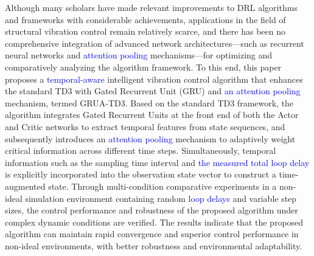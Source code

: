 \documentclass[review]{elsarticle}
\begin{document}
Although many scholars have made relevant improvements to DRL algorithms and frameworks with considerable achievements, applications in the field of structural vibration control remain relatively scarce, and there has been no comprehensive integration of advanced network architectures—such as recurrent neural networks and \textcolor{blue}{attention pooling} mechanisms—for optimizing and comparatively analyzing the algorithm framework.
To this end, this paper proposes a \textcolor{blue}{temporal-aware} intelligent vibration control algorithm that enhances the standard TD3 with Gated Recurrent Unit (GRU) and \textcolor{blue}{an attention pooling} mechanism, termed GRUA-TD3.
Based on the standard TD3 framework, the algorithm integrates Gated Recurrent Units at the front end of both the Actor and Critic networks to extract temporal features from state sequences, and subsequently introduces an \textcolor{blue}{attention pooling} mechanism to adaptively weight critical information across different time steps.
Simultaneously, temporal information such as the sampling time interval and \textcolor{blue}{the measured total loop delay} is explicitly incorporated into the observation state vector to construct a time-augmented state.
Through multi-condition comparative experiments in a non-ideal simulation environment containing random \textcolor{blue}{loop delays} and variable step sizes, the control performance and robustness of the proposed algorithm under complex dynamic conditions are verified.
The results indicate that the proposed algorithm can maintain rapid convergence and superior control performance in non-ideal environments, with better robustness and environmental adaptability.
\end{document}
